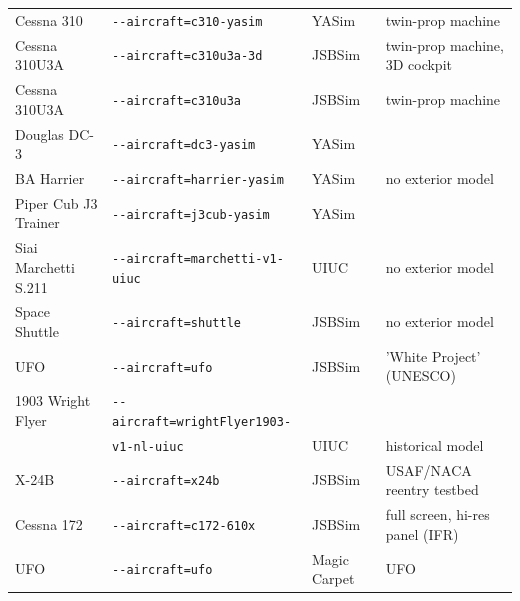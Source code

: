\begin{tabular}{l|l|l|l}
   Cessna 310					&		\texttt{-$ $-aircraft=c310-yasim}                  
   &  YASim &  twin-prop machine         \\
   Cessna 310U3A &		\texttt{-$ $-aircraft=c310u3a-3d}                  
   & JSBSim &  twin-prop machine, 3D cockpit         \\
   Cessna 310U3A			&		\texttt{-$ $-aircraft=c310u3a}                     
   & JSBSim &  twin-prop machine         \\
   Douglas DC-3	  		&		\texttt{-$ $-aircraft=dc3-yasim}                   
   &  YASim &           \\
   BA Harrier	&		\texttt{-$ $-aircraft=harrier-yasim}               
   &  YASim & no exterior model         \\
   Piper Cub J3 Trainer				&		\texttt{-$ $-aircraft=j3cub-yasim}                 
   &  YASim &           \\
   Siai Marchetti S.211			&		\texttt{-$ $-aircraft=marchetti-v1-uiuc}           
   &  UIUC & no exterior model          \\
   Space Shuttle					&		\texttt{-$ $-aircraft=shuttle}                     
   & JSBSim & no exterior model          \\
   UFO 	&		\texttt{-$ $-aircraft=ufo}               
   & JSBSim & 'White Project' (UNESCO)            \\
   1903 Wright Flyer					&		\texttt{-$ $-aircraft=wrightFlyer1903-}  
   & &          \\
   					&		\texttt{v1-nl-uiuc}  
   & UIUC & historical model          \\
      X-24B	&		\texttt{-$ $-aircraft=x24b}                        
   & JSBSim & USAF/NACA reentry testbed          \\
   Cessna 172  &	\texttt{-$ $-aircraft=c172-610x}         
   & JSBSim & full screen, hi-res panel (IFR)          \\
   UFO  &	\texttt{-$ $-aircraft=ufo}         
   & Magic Carpet & UFO       \\
\end{tabular}

